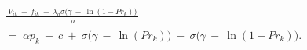 \begin{equation}
\begin{split}
    & \frac{ \ \dot{V}_{ik} \ + \ f_{ik} \ + \ \lambda_{a} \sigma \big( \gamma \ - \ \ln(1 - Pr_{k}) \big) \ }{\rho} \\
    & = \ \alpha p_{k} \ - \ c \ + \ \sigma \big( \gamma \ - \ \ln(Pr_{k}) \big) \ - \ \sigma \big( \gamma \ - \ \ln(1 - Pr_{k}) \big).
\end{split}
\label{Equation:Firms-Problem_Euler-Equation}
\end{equation}
